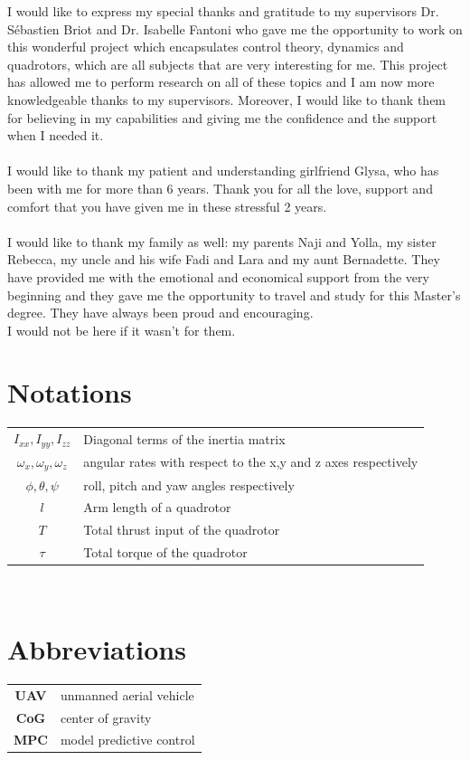 \documentclass{thesisreport}
\begin{document}
 I would like to express my special thanks and gratitude to my supervisors Dr. Sébastien Briot and Dr. Isabelle Fantoni who gave me the  opportunity to work on this wonderful project which encapsulates control theory, dynamics and quadrotors, which are all subjects that are very interesting for me. 
This project has allowed me to perform research on all of these topics and I am now more knowledgeable thanks to my supervisors. Moreover, I would like to thank them for believing in my capabilities and giving me the confidence and the support when I needed it. \\\\
I would like to thank my patient and understanding girlfriend Glysa, who has been with me for more than 6 years. Thank you for all the love, support and comfort that you have given me in these stressful 2 years. \\\\
I would like to thank my family as well: my parents Naji and Yolla, my sister Rebecca, my uncle and his wife Fadi and Lara and my aunt Bernadette. They have provided me with the emotional and economical support from the very beginning and they gave me the opportunity to travel and study for this Master's degree. They have always been proud and encouraging. \\I would not be here if it wasn't for them.
 
 \newpage
 
 
 \section*{Notations}
  \begin{tabular}{cp{}}
  $I_{xx}, I_{yy}, I_{zz}$ & Diagonal terms of the inertia matrix\\
  $\omega_x, \omega_y, \omega_z$ & angular rates with respect to the x,y and z axes respectively \\ 
  $\phi, \theta, \psi$ & roll, pitch and yaw angles respectively\\
  $l$ & Arm length of a quadrotor \\
  $T$ & Total thrust input of the quadrotor\\  
  $\tau$ & Total torque of the quadrotor\\
  

\end{tabular}\\
 \newpage
 
  \section*{Abbreviations}
 \begin{tabular}{cp{}}
  \textbf{UAV} & unmanned aerial vehicle \\
  \textbf{CoG} & center of gravity \\
  \textbf{MPC} & model predictive control \\
 \end{tabular}\\
 \newpage
 
\end{document}
